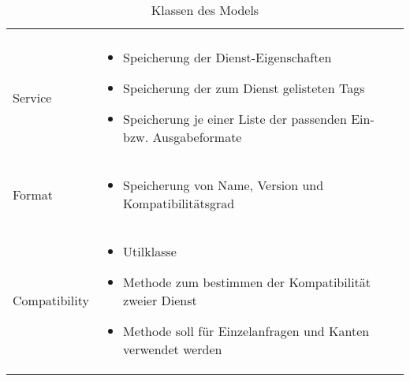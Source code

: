 \begin{table}[h]
\begin{tabularx}{\textwidth}{p{} | X}
\begin{itemize}
		\end{itemize} \\
		Service & \compress \begin{itemize}
			\item Speicherung der Dienst-Eigenschaften
			\item Speicherung der zum Dienst gelisteten Tags
			\item Speicherung je einer Liste der passenden Ein- bzw. Ausgabeformate
		\end{itemize} \\
		\rowcolor[HTML]{E7E7E7}
		Format & \compress \begin{itemize}
			\item Speicherung von Name, Version und Kompatibilitätsgrad
		\end{itemize} \\
		Compatibility & \compress \begin{itemize}
			\item Utilklasse
			\item Methode zum bestimmen der Kompatibilität zweier Dienst
			\item Methode soll für Einzelanfragen und Kanten verwendet werden
		\end{itemize} \\
	\end{tabularx}
	\caption{Klassen des Models}
	\label{table:klassenbeschreibung-a}
\end{table}

